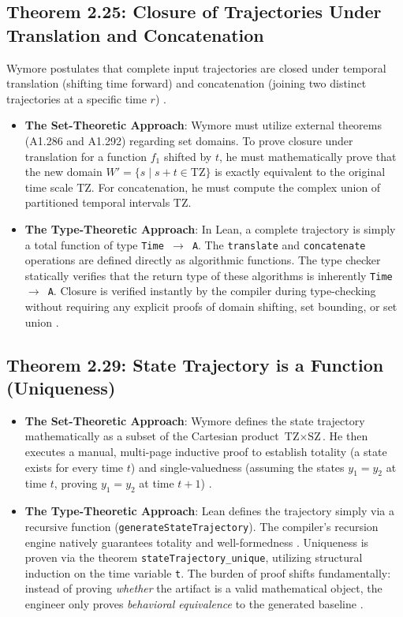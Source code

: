 \documentclass[11pt]{article}
\begin{document}
\subsection{Theorem 2.25: Closure of Trajectories Under Translation and Concatenation}
Wymore postulates that complete input trajectories are closed under temporal translation (shifting time forward) and concatenation (joining two distinct trajectories at a specific time $r$) \parencite{Ref27}.\begin{itemize}
 \item \textbf{The Set-Theoretic Approach}: Wymore must utilize external theorems (A1.286 and A1.292) regarding set domains. To prove closure under translation for a function $f_1$ shifted by $t$, he must mathematically prove that the new domain $W' = \{s \mid s + t \in \text{TZ}\}$ is exactly equivalent to the original time scale $\text{TZ}$. For concatenation, he must compute the complex union of partitioned temporal intervals $\text{TZ}$.
 \item \textbf{The Type-Theoretic Approach}: In Lean, a complete trajectory is simply a total function of type \texttt{Time $\to$ A}. The \texttt{translate} and \texttt{concatenate} operations are defined directly as algorithmic functions. The type checker statically verifies that the return type of these algorithms is inherently \texttt{Time $\to$ A}. Closure is verified instantly by the compiler during type-checking without requiring any explicit proofs of domain shifting, set bounding, or set union \parencite{Ref27}.\end{itemize}

\subsection{Theorem 2.29: State Trajectory is a Function (Uniqueness)}
\begin{itemize}
 \item \textbf{The Set-Theoretic Approach}: Wymore defines the state trajectory mathematically as a subset of the Cartesian product $\text{TZ} \times \text{SZ}$. He then executes a manual, multi-page inductive proof to establish totality (a state exists for every time $t$) and single-valuedness (assuming the states $y_1 = y_2$ at time $t$, proving $y_1 = y_2$ at time $t+1$) \parencite{Ref27}.\item \textbf{The Type-Theoretic Approach}: Lean defines the trajectory simply via a recursive function (\texttt{generateStateTrajectory}). The compiler's recursion engine natively guarantees totality and well-formedness \parencite{Ref27}. Uniqueness is proven via the theorem \texttt{stateTrajectory\_unique}, utilizing structural induction on the time variable \texttt{t}. The burden of proof shifts fundamentally: instead of proving \textit{whether} the artifact is a valid mathematical object, the engineer only proves \textit{behavioral equivalence} to the generated baseline \parencite{Ref27}.\end{itemize}
\end{document}
